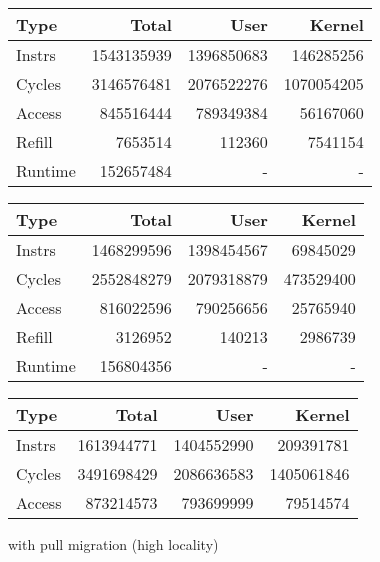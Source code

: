 \documentclass[11pt]{article}
\begin{document}
\begin{figure*}[h]
	\caption{60 threads consisting of 48 hard processes and 12 easy processes}	
	\centering
	\begin{subtable}{.48\linewidth}
		\centering                 
		\begin{tabular}{l|rrr}
			Type    & Total      & User       & Kernel     \\
			\hline
			Instrs  & 1543135939 & 1396850683 & 146285256  \\ 
			Cycles  & 3146576481 & 2076522276 & 1070054205 \\ 
			Access  & 845516444  & 789349384  & 56167060   \\ 
			Refill  & 7653514    & 112360     & 7541154    \\ 
			Runtime & 152657484  & -          & -          \\
			\hline 
		\end{tabular}
		\caption{without pull migration (high locality)}
	\end{subtable}
	\hfill
	\begin{subtable}{.48\linewidth}
		\begin{tabular}{l|rrr}
			Type    & Total      & User       & Kernel    \\
			\hline
			Instrs  & 1468299596 & 1398454567 & 69845029  \\ 
			Cycles  & 2552848279 & 2079318879 & 473529400 \\ 
			Access  & 816022596  & 790256656  & 25765940  \\ 
			Refill  & 3126952    & 140213     & 2986739   \\ 
			Runtime & 156804356  & -          & -         \\
			\hline
		\end{tabular}
		\caption{with pull migration (high locality)}
	\end{subtable}
	\begin{subtable}{.48\textwidth}
		\centering                 
		\begin{tabular}{l|rrr}       
			Type    & Total      & User       & Kernel     \\
			\hline
			Instrs  & 1613944771 & 1404552990 & 209391781  \\ 
			Cycles  & 3491698429 & 2086636583 & 1405061846 \\ 
			Access  & 873214573  & 793699999  & 79514574   \\ 

\end{tabular}
\end{subtable}
\end{figure*}
\end{document}
